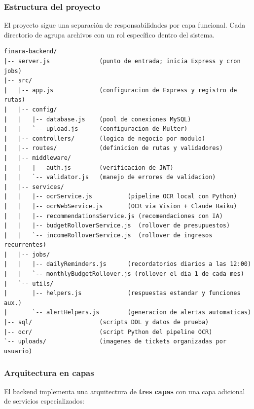 \subsubsection{Estructura del proyecto}

El proyecto sigue una separación de responsabilidades por capa
funcional. Cada directorio de  agrupa archivos con un
rol específico dentro del sistema.

\begin{lstlisting}[style=codigobase, language={},
    caption={Estructura de directorios del backend FINARA}]
finara-backend/
|-- server.js              (punto de entrada; inicia Express y cron jobs)
|-- src/
|   |-- app.js             (configuracion de Express y registro de rutas)
|   |-- config/
|   |   |-- database.js    (pool de conexiones MySQL)
|   |   `-- upload.js      (configuracion de Multer)
|   |-- controllers/       (logica de negocio por modulo)
|   |-- routes/            (definicion de rutas y validadores)
|   |-- middleware/
|   |   |-- auth.js        (verificacion de JWT)
|   |   `-- validator.js   (manejo de errores de validacion)
|   |-- services/
|   |   |-- ocrService.js          (pipeline OCR local con Python)
|   |   |-- ocrWebService.js       (OCR via Vision + Claude Haiku)
|   |   |-- recommendationsService.js (recomendaciones con IA)
|   |   |-- budgetRolloverService.js  (rollover de presupuestos)
|   |   `-- incomeRolloverService.js  (rollover de ingresos recurrentes)
|   |-- jobs/
|   |   |-- dailyReminders.js      (recordatorios diarios a las 12:00)
|   |   `-- monthlyBudgetRollover.js (rollover el dia 1 de cada mes)
|   `-- utils/
|       |-- helpers.js             (respuestas estandar y funciones aux.)
|       `-- alertHelpers.js        (generacion de alertas automaticas)
|-- sql/                   (scripts DDL y datos de prueba)
|-- ocr/                   (script Python del pipeline OCR)
`-- uploads/               (imagenes de tickets organizadas por usuario)
\end{lstlisting}

\subsubsection{Arquitectura en capas}

El backend implementa una arquitectura de \textbf{tres capas} con una
capa adicional de servicios especializados:

